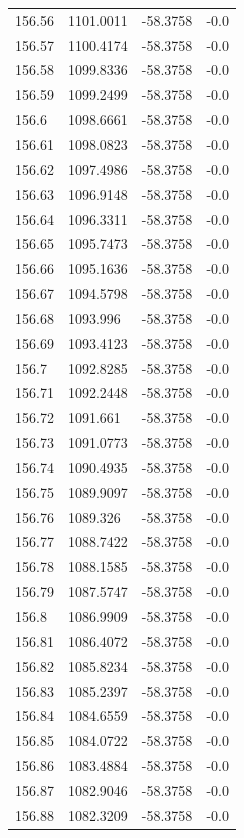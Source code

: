 \begin{table}[H]
\begin{tabular}{llll}
156.56 & 1101.0011 & -58.3758 & -0.0 \\
156.57 & 1100.4174 & -58.3758 & -0.0 \\
156.58 & 1099.8336 & -58.3758 & -0.0 \\
156.59 & 1099.2499 & -58.3758 & -0.0 \\
156.6 & 1098.6661 & -58.3758 & -0.0 \\
156.61 & 1098.0823 & -58.3758 & -0.0 \\
156.62 & 1097.4986 & -58.3758 & -0.0 \\
156.63 & 1096.9148 & -58.3758 & -0.0 \\
156.64 & 1096.3311 & -58.3758 & -0.0 \\
156.65 & 1095.7473 & -58.3758 & -0.0 \\
156.66 & 1095.1636 & -58.3758 & -0.0 \\
156.67 & 1094.5798 & -58.3758 & -0.0 \\
156.68 & 1093.996 & -58.3758 & -0.0 \\
156.69 & 1093.4123 & -58.3758 & -0.0 \\
156.7 & 1092.8285 & -58.3758 & -0.0 \\
156.71 & 1092.2448 & -58.3758 & -0.0 \\
156.72 & 1091.661 & -58.3758 & -0.0 \\
156.73 & 1091.0773 & -58.3758 & -0.0 \\
156.74 & 1090.4935 & -58.3758 & -0.0 \\
156.75 & 1089.9097 & -58.3758 & -0.0 \\
156.76 & 1089.326 & -58.3758 & -0.0 \\
156.77 & 1088.7422 & -58.3758 & -0.0 \\
156.78 & 1088.1585 & -58.3758 & -0.0 \\
156.79 & 1087.5747 & -58.3758 & -0.0 \\
156.8 & 1086.9909 & -58.3758 & -0.0 \\
156.81 & 1086.4072 & -58.3758 & -0.0 \\
156.82 & 1085.8234 & -58.3758 & -0.0 \\
156.83 & 1085.2397 & -58.3758 & -0.0 \\
156.84 & 1084.6559 & -58.3758 & -0.0 \\
156.85 & 1084.0722 & -58.3758 & -0.0 \\
156.86 & 1083.4884 & -58.3758 & -0.0 \\
156.87 & 1082.9046 & -58.3758 & -0.0 \\
156.88 & 1082.3209 & -58.3758 & -0.0 \\

\end{tabular}
\end{table}

